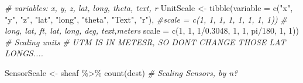 \documentclass[
]{article}
\newenvironment{Shaded}{\begin{snugshade}}{\end{snugshade}}
\newcommand{\AttributeTok}[1]{\textcolor[rgb]{0.77,0.63,0.00}{#1}}
\newcommand{\CommentTok}[1]{\textcolor[rgb]{0.56,0.35,0.01}{\textit{#1}}}
\newcommand{\DecValTok}[1]{\textcolor[rgb]{0.00,0.00,0.81}{#1}}
\newcommand{\FloatTok}[1]{\textcolor[rgb]{0.00,0.00,0.81}{#1}}
\newcommand{\FunctionTok}[1]{\textcolor[rgb]{0.00,0.00,0.00}{#1}}
\newcommand{\NormalTok}[1]{#1}
\newcommand{\OtherTok}[1]{\textcolor[rgb]{0.56,0.35,0.01}{#1}}
\newcommand{\SpecialCharTok}[1]{\textcolor[rgb]{0.00,0.00,0.00}{#1}}
\newcommand{\StringTok}[1]{\textcolor[rgb]{0.31,0.60,0.02}{#1}}
\begin{document}
\begin{Shaded}
\begin{Highlighting}[]
\CommentTok{\# variables: x, y, z, lat, long, theta, text, r}
\NormalTok{UnitScale }\OtherTok{\textless{}{-}} \FunctionTok{tibble}\NormalTok{(}\AttributeTok{variable =} \FunctionTok{c}\NormalTok{(}\StringTok{"x"}\NormalTok{, }\StringTok{"y"}\NormalTok{, }\StringTok{"z"}\NormalTok{, }\StringTok{"lat"}\NormalTok{, }\StringTok{"long"}\NormalTok{, }\StringTok{"theta"}\NormalTok{, }\StringTok{"Text"}\NormalTok{, }\StringTok{"r"}\NormalTok{),}
                    \CommentTok{\#scale = c(1, 1, 1, 1, 1, 1, 1, 1))}
                    \CommentTok{\#           long, lat, ft, lat, long, deg, text,meters}
                      \AttributeTok{scale =} \FunctionTok{c}\NormalTok{(}\DecValTok{1}\NormalTok{, }\DecValTok{1}\NormalTok{, }\DecValTok{1}\SpecialCharTok{/}\FloatTok{0.3048}\NormalTok{, }\DecValTok{1}\NormalTok{, }\DecValTok{1}\NormalTok{, pi}\SpecialCharTok{/}\DecValTok{180}\NormalTok{, }\DecValTok{1}\NormalTok{, }\DecValTok{1}\NormalTok{)) }\CommentTok{\# Scaling units}
\CommentTok{\# UTM IS IN METESR, SO DONT CHANGE THOSE LAT LONGS....}

\NormalTok{SensorScale }\OtherTok{\textless{}{-}}\NormalTok{ sheaf }\SpecialCharTok{\%\textgreater{}\%} \FunctionTok{count}\NormalTok{(dest) }\CommentTok{\# Scaling Sensors, by n?}
\end{Highlighting}
\end{Shaded}
\end{document}
